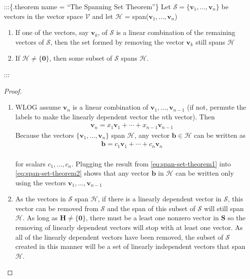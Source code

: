 \documentclass[
]{book}
\theoremstyle{definition}
\theoremstyle{definition}
\theoremstyle{definition}
\theoremstyle{remark}
\begin{document}
:::\{.theorem name = ``The Spanning Set Theorem''\}
Let \(\mathcal{S} = \{\mathbf{v}_1, \ldots, \mathbf{v}_n\}\) be vectors in the vector space \(\mathcal{V}\) and let \(\mathcal{H}\) = span(\(\mathbf{v}_1, \ldots, \mathbf{v}_n\))

\begin{enumerate}
\def\labelenumi{\alph{enumi})}
\item
  If one of the vectors, say \(\mathbf{v}_k\), of \(\mathcal{S}\) is a linear combination of the remaining vectors of \(\mathcal{S}\), then the set formed by removing the vector \(\mathbf{v}_k\) still spans \(\mathcal{H}\)
\item
  If \(\mathcal{H} \neq \{\mathbf{0}\}\), then some subset of \(\mathcal{S}\) spans \(\mathcal{H}\).
\end{enumerate}

:::

\begin{proof}

\begin{enumerate}
\def\labelenumi{\alph{enumi})}
\item
  WLOG assume \(\mathbf{v}_n\) is a linear combination of \(\mathbf{v}_1, \ldots, \mathbf{v}_{n-1}\) (if not, permute the labels to make the linearly dependent vector the \(n\)th vector). Then
  \[
  \begin{aligned}
  \mathbf{v}_n = x_1 \mathbf{v}_1 + \cdots + x_{n-1} \mathbf{v}_{n-1}
  \end{aligned}
  \label{eq:span-set-theorem1}
  \]
  Because the vectors \(\{\mathbf{v}_1, \ldots, \mathbf{v}_n\}\) span \(\mathcal{H}\), any vector \(\mathbf{b}\in \mathcal{H}\) can be written as
  \[
  \begin{aligned}
  \mathbf{b} = c_1 \mathbf{v}_1 + \cdots + c_{n} \mathbf{v}_{n}
  \end{aligned}
  \label{eq:span-set-theorem2}
  \]\\
  for scalars \(c_1, \ldots, c_n\). Plugging the result from \eqref{eq:span-set-theorem1} into \eqref{eq:span-set-theorem2} shows that any vector \(\mathbf{b}\) in \(\mathcal{H}\) can be written only using the vectors \(\mathbf{v}_1, \ldots, \mathbf{v}_{n-1}\)
\item
  As the vectors in \(\mathcal{S}\) span \(\mathcal{H}\), if there is a linearly dependent vector in \(\mathcal{S}\), this vector can be removed from \(\mathcal{S}\) and the span of this subset of \(\mathcal{S}\) will still span \(\mathcal{H}\). As long as \(\mathbf{H} \neq \{\mathbf{0}\}\), there must be a least one nonzero vector in \(\mathbf{S}\) so the removing of linearly dependent vectors will stop with at least one vector. As all of the linearly dependent vectors have been removed, the subset of \(\mathcal{S}\) created in this manner will be a set of linearly independent vectors that span \(\mathcal{H}\).
\end{enumerate}

\end{proof}
\end{document}
